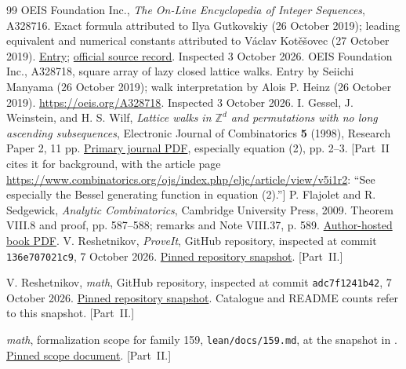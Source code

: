 \documentclass[11pt,letterpaper]{article}
\theoremstyle{remark}\newtheorem{remark}[theorem]{Remark}
\begin{document}
\begin{thebibliography}{99}
OEIS Foundation Inc., \emph{The On-Line Encyclopedia of Integer Sequences}, A328716.
Exact formula attributed to Ilya Gutkovskiy (26 October 2019); leading equivalent and numerical constants attributed to V\'aclav Kot\v e\v sovec (27 October 2019).
\href{https://oeis.org/A328716}{Entry};
\href{https://github.com/oeis/oeisdata/blob/main/seq/A328/A328716.seq}{official source record}.
Inspected 3 October 2026.
OEIS Foundation Inc., A328718, square array of lazy closed lattice walks.
Entry by Seiichi Manyama (26 October 2019); walk interpretation by Alois P. Heinz (26 October 2019).
\url{https://oeis.org/A328718}. Inspected 3 October 2026.
I. Gessel, J. Weinstein, and H. S. Wilf,
\emph{Lattice walks in $\mathbb Z^d$ and permutations with no long ascending subsequences},
Electronic Journal of Combinatorics \textbf{5} (1998), Research Paper 2, 11 pp.
\href{https://www.combinatorics.org/ojs/index.php/eljc/article/download/v5i1r2/pdf}{Primary journal PDF}, especially equation (2), pp. 2--3.
[Part~II cites it for background, with the article page \url{https://www.combinatorics.org/ojs/index.php/eljc/article/view/v5i1r2}: ``See especially the Bessel generating function in equation (2).'']
P. Flajolet and R. Sedgewick, \emph{Analytic Combinatorics}, Cambridge University Press, 2009.
Theorem VIII.8 and proof, pp. 587--588; remarks and Note VIII.37, p. 589.
\href{https://algo.inria.fr/flajolet/Publications/book.pdf}{Author-hosted book PDF}.
V. Reshetnikov, \emph{ProveIt}, GitHub repository, inspected at commit
\texttt{136e707021c9}, 7 October 2026.
\href{https://github.com/VladimirReshetnikov/ProveIt/tree/136e707021c9df3a1b6af904ddad045ae38b7c23}{Pinned repository snapshot}.
[Part~II.]

V. Reshetnikov, \emph{math}, GitHub repository, inspected at commit
\texttt{adc7f1241b42}, 7 October 2026.
\href{https://github.com/VladimirReshetnikov/math/tree/adc7f1241b42e322a6451854ab7e4b4c146bf78a}{Pinned repository snapshot}.
Catalogue and README counts refer to this snapshot.
[Part~II.]

\emph{math}, formalization scope for family 159,
\texttt{lean/docs/159.md}, at the snapshot in \cite{mathrepo}.
\href{https://github.com/VladimirReshetnikov/math/blob/adc7f1241b42e322a6451854ab7e4b4c146bf78a/lean/docs/159.md}{Pinned scope document}.
[Part~II.]


\end{thebibliography}
\end{document}
